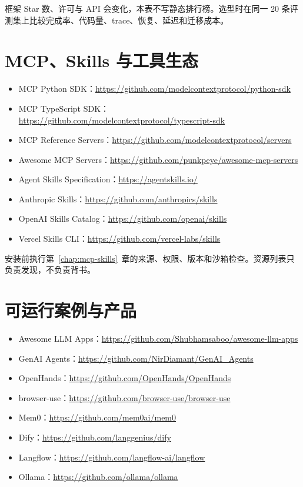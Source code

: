 框架 Star 数、许可与 API 会变化，本表不写静态排行榜。选型时在同一 20 条评测集上比较完成率、代码量、trace、恢复、延迟和迁移成本。

\section{MCP、Skills 与工具生态}

\begin{itemize}
  \item MCP Python SDK：\url{https://github.com/modelcontextprotocol/python-sdk}
  \item MCP TypeScript SDK：\url{https://github.com/modelcontextprotocol/typescript-sdk}
  \item MCP Reference Servers：\url{https://github.com/modelcontextprotocol/servers}
  \item Awesome MCP Servers：\url{https://github.com/punkpeye/awesome-mcp-servers}
  \item Agent Skills Specification：\url{https://agentskills.io/}
  \item Anthropic Skills：\url{https://github.com/anthropics/skills}
  \item OpenAI Skills Catalog：\url{https://github.com/openai/skills}
  \item Vercel Skills CLI：\url{https://github.com/vercel-labs/skills}
\end{itemize}

安装前执行第~\ref{chap:mcp-skills}~章的来源、权限、版本和沙箱检查。资源列表只负责发现，不负责背书。

\section{可运行案例与产品}

\begin{itemize}
  \item Awesome LLM Apps：\url{https://github.com/Shubhamsaboo/awesome-llm-apps}
  \item GenAI Agents：\url{https://github.com/NirDiamant/GenAI_Agents}
  \item OpenHands：\url{https://github.com/OpenHands/OpenHands}
  \item browser-use：\url{https://github.com/browser-use/browser-use}
  \item Mem0：\url{https://github.com/mem0ai/mem0}
  \item Dify：\url{https://github.com/langgenius/dify}
  \item Langflow：\url{https://github.com/langflow-ai/langflow}
  \item Ollama：\url{https://github.com/ollama/ollama}
\end{itemize}

